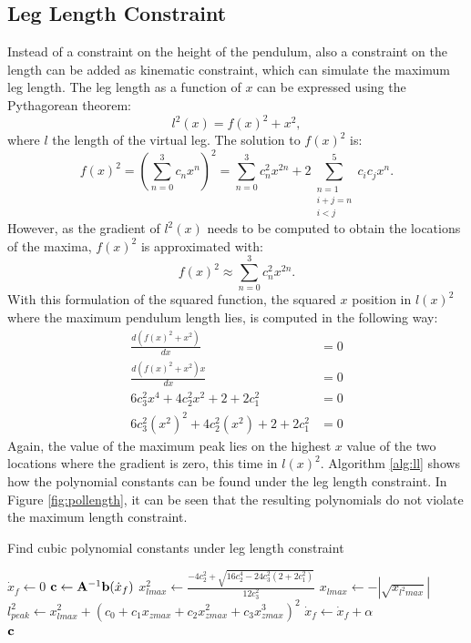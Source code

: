 \subsection{Leg Length Constraint}
Instead of a constraint on the height of the pendulum, also a constraint on the length can be added as kinematic constraint, which can simulate the maximum leg length. The leg length as a function of $x$ can be expressed using the Pythagorean theorem:
\begin{equation}
	l^2(x) = f(x)^2 + x^2,
\end{equation}
where $l$ the length of the virtual leg. The solution to $f(x)^2$ is:
\begin{equation}
f(x)^2=(\sum_{n=0}^3 c_n x^n)^2 = \sum_{n=0}^3 c_n^2 x^{2n} + 2\sum_{\substack{n=1 \\ i+j=n \\ i < j}}^5 c_i c_j x^n. 
\end{equation}
However, as the gradient of $l^2(x)$ needs to be computed to obtain the locations of the maxima, $f(x)^2$ is approximated with:
\begin{equation*}
	f(x)^2\approx \sum_{n=0}^3 c_n^2 x^{2n}.
\end{equation*}
With this formulation of the squared function, the squared $x$ position in $l(x)^2$ where the maximum pendulum length lies, is computed in the following way:
\begin{align}
	\frac{d(f(x)^2+x^2)}{dx}&=0\\
	\frac{d(f(x)^2+x^2)x}{dx}&=0\\
	6c_3^2 x^4 + 4 c_2^2 x^2 + 2+2c_1^2 &= 0\\
	6c_3^2 (x^2)^2 + 4 c_2^2 (x^2) + 2+2c_1^2 &= 0
\end{align}
Again, the value of the maximum peak lies on the highest $x$ value of the two locations where the gradient is zero, this time in $l(x)^2$. Algorithm \ref{alg:ll} shows how the polynomial constants can be found under the leg length constraint. In Figure \ref{fig:pollength}, it can be seen that the resulting polynomials do not violate the maximum length constraint.
\begin{algorithm}
\caption{Find cubic polynomial constants under leg length constraint}
\label{alg:ll}
\begin{algorithmic}[1]
    \State $\dot{x}_{f}\gets 0$
        \Repeat
            \State $\mathbf{c}\gets \mathbf{A}^{-1}\mathbf{b}(\dot{x}_{f})$ 
            \State $x_{lmax}^2 \gets \frac{-4c_2^2+\sqrt{16c_2^4-24c_3^2(2+2c_1^2)}}{12c_3^2}$   
            \State $x_{lmax}\gets-|\sqrt{x_{l^2max}}|$                
            \State $l_{peak}^2 \gets x_{lmax}^2 + (c_0 + c_1x_{zmax} + c_2x_{zmax}^2+ c_3x_{zmax}^3)^2$ 
            \State $\dot{x}_{f} \gets \dot{x}_{f}+\alpha$   
        \\
    \Return $\mathbf{c}$    
\end{algorithmic}
\end{algorithm}
